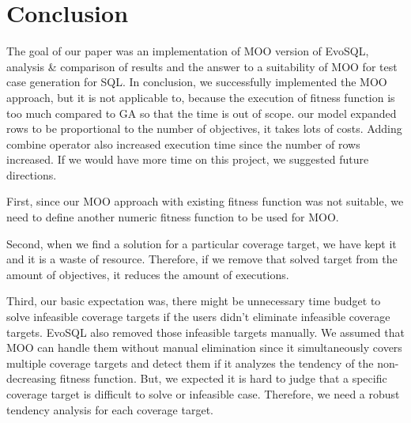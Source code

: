 \chapter{Conclusion}

The goal of our paper was an implementation of MOO version of EvoSQL, analysis \& comparison of results and the answer to a suitability of MOO for test case generation for SQL.
In conclusion, we successfully implemented the MOO approach, but it is not applicable to, because the execution of fitness function is too much compared to GA so that the time is out of scope. our model expanded rows to be proportional to the number of objectives, it takes lots of costs. Adding combine operator also increased execution time since the number of rows increased. If we would have more time on this project, we suggested future directions.


First, since our MOO approach with existing fitness function was not suitable, we need to define another numeric fitness function to be used for MOO. 


Second, when we find a solution for a particular coverage target, we have kept it and it is a waste of resource. Therefore, if we remove that solved target from the amount of objectives, it reduces the amount of executions. 


Third, our basic expectation was, there might be unnecessary time budget to solve infeasible coverage targets if the users didn't eliminate infeasible coverage targets. EvoSQL also removed those infeasible targets manually. We assumed that MOO can handle them without manual elimination since it simultaneously covers multiple coverage targets and detect them if it analyzes the tendency of the non-decreasing fitness function. But, we expected it is hard to judge that a specific coverage target is difficult to solve or infeasible case. Therefore, we need a robust tendency analysis for each coverage target. 

